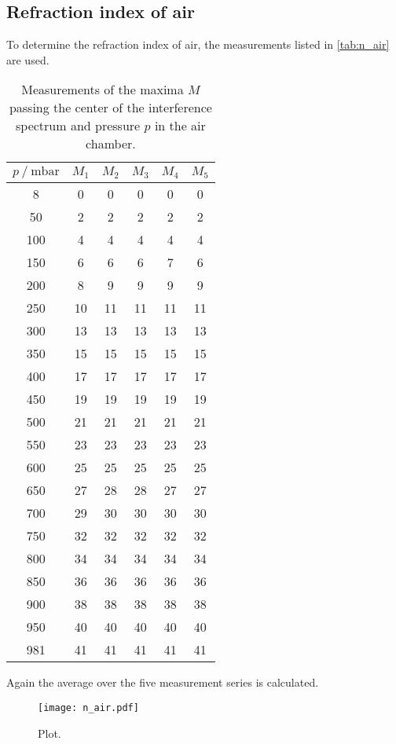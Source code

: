 \subsection{Refraction index of air}
To determine the refraction index of air, the measurements listed in \autoref{tab:n_air} are used.
\begin{table}
  \centering
  \caption{Measurements of the maxima $M$ passing the center of the interference spectrum and pressure $p$ in the air chamber.}
  \label{tab:n_air}
  \begin{tabular}{c c c c c c}
    \toprule
    {$p \mathbin{/} \unit{\milli\bar}$} & {$M_1$} & {$M_2$} & {$M_3$} & {$M_4$} & {$M_5$}\\
    \midrule
    {  8} & { 0} & { 0} & { 0} & { 0} & { 0} \\
    { 50} & { 2} & { 2} & { 2} & { 2} & { 2} \\
    {100} & { 4} & { 4} & { 4} & { 4} & { 4} \\
    {150} & { 6} & { 6} & { 6} & { 7} & { 6} \\
    {200} & { 8} & { 9} & { 9} & { 9} & { 9} \\
    {250} & {10} & {11} & {11} & {11} & {11} \\
    {300} & {13} & {13} & {13} & {13} & {13} \\
    {350} & {15} & {15} & {15} & {15} & {15} \\
    {400} & {17} & {17} & {17} & {17} & {17} \\
    {450} & {19} & {19} & {19} & {19} & {19} \\
    {500} & {21} & {21} & {21} & {21} & {21} \\
    {550} & {23} & {23} & {23} & {23} & {23} \\
    {600} & {25} & {25} & {25} & {25} & {25} \\
    {650} & {27} & {28} & {28} & {27} & {27} \\
    {700} & {29} & {30} & {30} & {30} & {30} \\
    {750} & {32} & {32} & {32} & {32} & {32} \\
    {800} & {34} & {34} & {34} & {34} & {34} \\
    {850} & {36} & {36} & {36} & {36} & {36} \\
    {900} & {38} & {38} & {38} & {38} & {38} \\
    {950} & {40} & {40} & {40} & {40} & {40} \\
    {981} & {41} & {41} & {41} & {41} & {41} \\
    \bottomrule
  \end{tabular}
\end{table}
Again the average over the five measurement series is calculated.

\begin{figure}
  \centering
  \texttt{[image: n\_air.pdf]}
  \caption{Plot.}
  \label{fig:n_air}
\end{figure}
